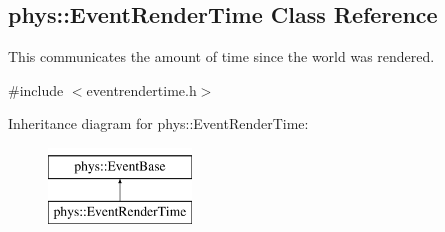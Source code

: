 \hypertarget{classphys_1_1EventRenderTime}{
\subsection{phys::EventRenderTime Class Reference}
\label{d3/d8b/classphys_1_1EventRenderTime}
}


This communicates the amount of time since the world was rendered.  




{\ttfamily \#include $<$eventrendertime.h$>$}

Inheritance diagram for phys::EventRenderTime:\begin{figure}[H]
\begin{center}
\leavevmode
\includegraphics[height=2.000000cm]{d3/d8b/classphys_1_1EventRenderTime}
\end{center}
\end{figure}

